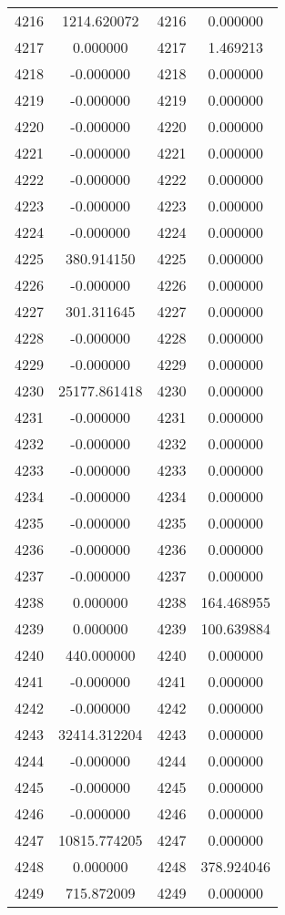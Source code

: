 \documentclass[12pt]{article}
\begin{document}
\begin{longtable}{@{}cccc@{}}
4216 & 1214.620072 & 4216 & 0.000000 \\
4217 & 0.000000 & 4217 & 1.469213 \\
4218 & -0.000000 & 4218 & 0.000000 \\
4219 & -0.000000 & 4219 & 0.000000 \\
4220 & -0.000000 & 4220 & 0.000000 \\
4221 & -0.000000 & 4221 & 0.000000 \\
4222 & -0.000000 & 4222 & 0.000000 \\
4223 & -0.000000 & 4223 & 0.000000 \\
4224 & -0.000000 & 4224 & 0.000000 \\
4225 & 380.914150 & 4225 & 0.000000 \\
4226 & -0.000000 & 4226 & 0.000000 \\
4227 & 301.311645 & 4227 & 0.000000 \\
4228 & -0.000000 & 4228 & 0.000000 \\
4229 & -0.000000 & 4229 & 0.000000 \\
4230 & 25177.861418 & 4230 & 0.000000 \\
4231 & -0.000000 & 4231 & 0.000000 \\
4232 & -0.000000 & 4232 & 0.000000 \\
4233 & -0.000000 & 4233 & 0.000000 \\
4234 & -0.000000 & 4234 & 0.000000 \\
4235 & -0.000000 & 4235 & 0.000000 \\
4236 & -0.000000 & 4236 & 0.000000 \\
4237 & -0.000000 & 4237 & 0.000000 \\
4238 & 0.000000 & 4238 & 164.468955 \\
4239 & 0.000000 & 4239 & 100.639884 \\
4240 & 440.000000 & 4240 & 0.000000 \\
4241 & -0.000000 & 4241 & 0.000000 \\
4242 & -0.000000 & 4242 & 0.000000 \\
4243 & 32414.312204 & 4243 & 0.000000 \\
4244 & -0.000000 & 4244 & 0.000000 \\
4245 & -0.000000 & 4245 & 0.000000 \\
4246 & -0.000000 & 4246 & 0.000000 \\
4247 & 10815.774205 & 4247 & 0.000000 \\
4248 & 0.000000 & 4248 & 378.924046 \\
4249 & 715.872009 & 4249 & 0.000000 \\

\end{longtable}
\end{document}
